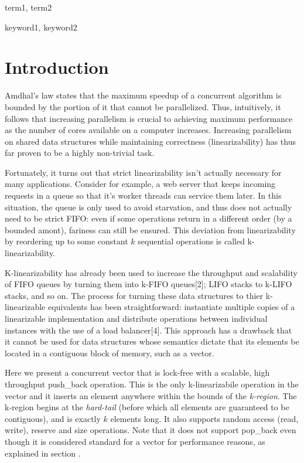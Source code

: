 \documentclass{sigplanconf}
\begin{document}

\terms
term1, term2

\keywords
keyword1, keyword2

\section{Introduction}

Amdhal's law states that the maximum speedup of a concurrent algorithm is bounded by the portion of it that cannot be parallelized. Thus, intuitively, it follows that increasing parallelism is crucial to achieving maximum performance as the number of cores available on a computer increases. Increasing parallelism on shared data structures while maintaining correctness (linearizability) has thus far proven to be a highly non-trivial task.

Fortunately, it turns out that strict linearizability isn't actually necessary for many applications. Consider for example, a web server that keeps incoming requests in a queue so that it's worker threads can service them later. In this situation, the queue is only used to avoid starvation, and thus does not actually need to be strict FIFO: even if some operations return in a different order (by a bounded amont), fariness can still be ensured. This deviation from linearizability by reordering up to some constant $k$ sequential operations is called k-linearizability.

K-linearizability has already been used to increase the throughput and scalability of FIFO queues by turning them into k-FIFO queues[2]; LIFO stacks to k-LIFO stacks, and so on. The process for turning these data structures to thier k-linearizable equivalents has been straightforward: instantiate multiple copies of a linearizable implementation and distribute operations between individual instances with the use of a load balancer[4]. This approach has a drawback that it cannot be used for data structures whose semantics dictate that its elements be located in a contiguous block of memory, such as a vector.

Here we present a concurrent vector that is lock-free with a scalable, high throughput push\_back operation. This is the only k-linearizabile operation in the vector and it inserts an element anywhere within the bounds of the \emph{k-region}. The k-region begins at the \emph{hard-tail} (before which all elements are guaranteed to be contiguous), and is exactly $k$ elements long. It also supports random access (read, write), reserve and size operations. Note that it does not support pop\_back even though it is considered standard for a vector for performance reasons, as explained in section \autocite{sec:popback}.
\end{document}
